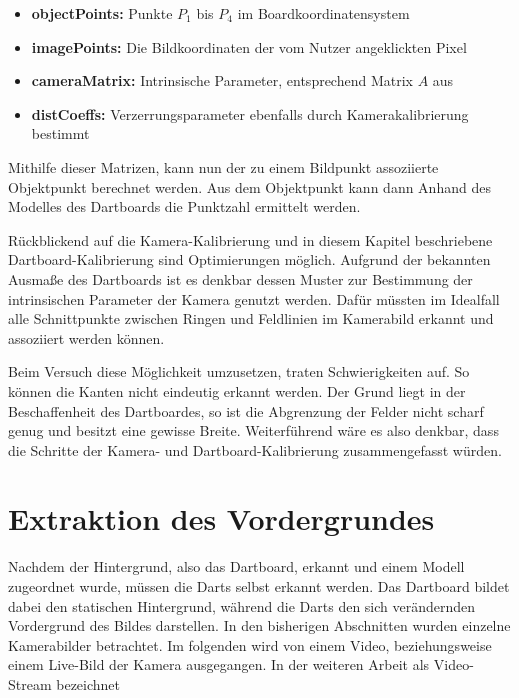 \begin{itemize}
\item \textbf{objectPoints:} Punkte $P_1$ bis $P_4$ im Boardkoordinatensystem
\item \textbf{imagePoints:} Die Bildkoordinaten der vom Nutzer angeklickten Pixel
\item \textbf{cameraMatrix:} Intrinsische Parameter, entsprechend Matrix $A$ aus 
\item \textbf{distCoeffs:} Verzerrungsparameter ebenfalls durch Kamerakalibrierung bestimmt 
\end{itemize}
Mithilfe dieser Matrizen, kann nun der zu einem Bildpunkt assoziierte Objektpunkt berechnet werden. Aus dem Objektpunkt kann dann Anhand des Modelles des Dartboards die Punktzahl ermittelt werden. 

Rückblickend auf die Kamera-Kalibrierung und in diesem Kapitel beschriebene Dartboard-Kalibrierung sind Optimierungen möglich. Aufgrund der bekannten Ausmaße des Dartboards ist es denkbar dessen Muster zur Bestimmung der intrinsischen Parameter der Kamera  genutzt werden. Dafür müssten im Idealfall alle Schnittpunkte zwischen Ringen und Feldlinien im Kamerabild erkannt und assoziiert werden können. 

Beim Versuch diese Möglichkeit umzusetzen, traten Schwierigkeiten auf. So können die Kanten nicht eindeutig erkannt werden.
Der Grund liegt in der Beschaffenheit des Dartboardes, so ist die Abgrenzung der Felder nicht scharf genug und besitzt eine gewisse Breite. Weiterführend wäre es also denkbar, dass die Schritte der Kamera- und Dartboard-Kalibrierung zusammengefasst würden. 


\section{Extraktion des Vordergrundes}
\label{sec:substraction}
Nachdem der Hintergrund, also das Dartboard, erkannt und einem Modell zugeordnet wurde, müssen die Darts selbst erkannt werden. Das Dartboard bildet dabei den statischen Hintergrund, während die Darts den sich verändernden Vordergrund des Bildes darstellen. 
In den bisherigen Abschnitten wurden einzelne Kamerabilder betrachtet. Im folgenden wird von einem Video, beziehungsweise einem Live-Bild der Kamera ausgegangen. In der weiteren Arbeit als Video-Stream bezeichnet

